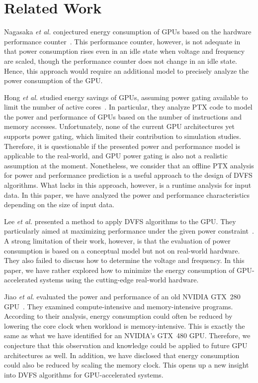 \section{Related Work} 
\label{sec:related_work}

Nagasaka \textit{et al.} conjectured energy consumption of GPUs based on
the hardware performance counter~\cite{Nagasaka2010}.
This performance counter, however, is not adequate in that power
consumption rises even in an idle state when voltage and frequency are
scaled, though the performance counter does not change in an idle
state.
Hence, this approach would require an additional model to precisely
analyze the power consumption of the GPU.

Hong \textit{et al.} studied energy savings of GPUs, assuming power
gating available to limit the number of active
cores~\cite{Hong2009,Hong2010}.
In particular, they analyze PTX code to model the power and performance
of GPUs based on the number of instructions and memory accesses.
Unfortunately, none of the current GPU architectures yet supports power
gating, which limited their contribution to simulation studies.
Therefore, it is questionable if the presented power and performance
model is applicable to the real-world, and GPU power gating is also not
a realistic assumption at the moment.
Nonetheless, we consider that an offline PTX analysis for power and
performance prediction is a useful approach to the design of DVFS
algorithms.
What lacks in this approach, however, is a runtime analysis for input
data.
In this paper, we have analyzed the power and performance
characteristics depending on the size of input data. 

Lee \textit{et al.} presented a method to apply DVFS algorithms to the
GPU.
They particularly aimed at maximizing performance under the given power
constraint~\cite{Lee2011}.
A strong limitation of their work, however, is that the evaluation of
power consumption is based on a conceptual model but not on real-world
hardware.
They also failed to discuss how to determine the voltage and frequency.
In this paper, we have rather explored how to minimize the energy
consumption of GPU-accelerated systems using the cutting-edge real-world
hardware.

Jiao \textit{et al.} evaluated the power and performance of an old
NVIDIA GTX~280 GPU~\cite{Jiao2010}.
They examined compute-intensive and memory-intensive programs.
According to their analysis, energy consumption could often be reduced
by lowering the core clock when workload is memory-intensive.
This is exactly the same as what we have identified for an NVIDIA's
GTX~480 GPU.
Therefore, we conjecture that this observation and knowledge could be
applied to future GPU architectures as well.
In addition, we have disclosed that energy consumption could also be
reduced by scaling the memory clock.
This opens up a new insight into DVFS algorithms for GPU-accelerated
systems.

